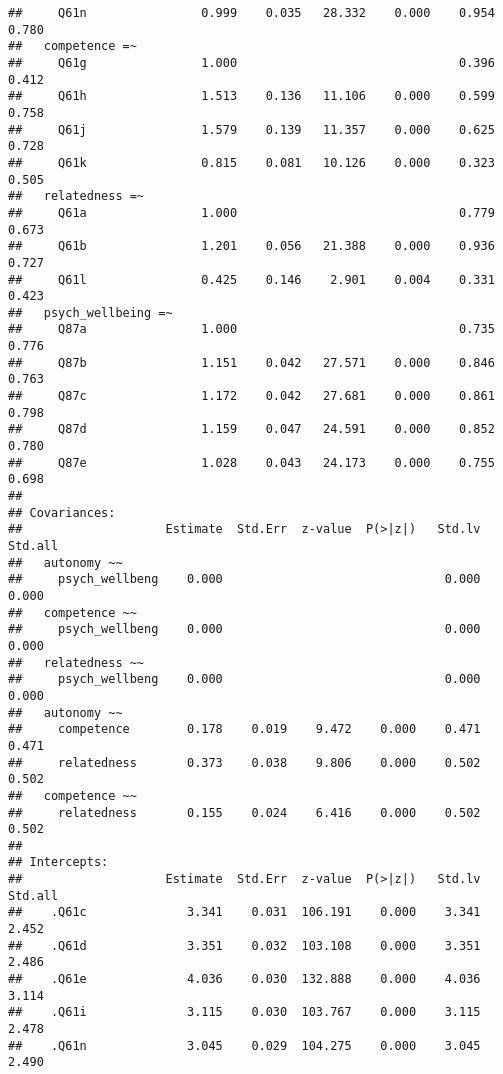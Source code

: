 \documentclass[
]{article}
\begin{document}
\begin{verbatim}
##     Q61n                0.999    0.035   28.332    0.000    0.954    0.780
##   competence =~                                                           
##     Q61g                1.000                               0.396    0.412
##     Q61h                1.513    0.136   11.106    0.000    0.599    0.758
##     Q61j                1.579    0.139   11.357    0.000    0.625    0.728
##     Q61k                0.815    0.081   10.126    0.000    0.323    0.505
##   relatedness =~                                                          
##     Q61a                1.000                               0.779    0.673
##     Q61b                1.201    0.056   21.388    0.000    0.936    0.727
##     Q61l                0.425    0.146    2.901    0.004    0.331    0.423
##   psych_wellbeing =~                                                      
##     Q87a                1.000                               0.735    0.776
##     Q87b                1.151    0.042   27.571    0.000    0.846    0.763
##     Q87c                1.172    0.042   27.681    0.000    0.861    0.798
##     Q87d                1.159    0.047   24.591    0.000    0.852    0.780
##     Q87e                1.028    0.043   24.173    0.000    0.755    0.698
## 
## Covariances:
##                    Estimate  Std.Err  z-value  P(>|z|)   Std.lv  Std.all
##   autonomy ~~                                                           
##     psych_wellbeng    0.000                               0.000    0.000
##   competence ~~                                                         
##     psych_wellbeng    0.000                               0.000    0.000
##   relatedness ~~                                                        
##     psych_wellbeng    0.000                               0.000    0.000
##   autonomy ~~                                                           
##     competence        0.178    0.019    9.472    0.000    0.471    0.471
##     relatedness       0.373    0.038    9.806    0.000    0.502    0.502
##   competence ~~                                                         
##     relatedness       0.155    0.024    6.416    0.000    0.502    0.502
## 
## Intercepts:
##                    Estimate  Std.Err  z-value  P(>|z|)   Std.lv  Std.all
##    .Q61c              3.341    0.031  106.191    0.000    3.341    2.452
##    .Q61d              3.351    0.032  103.108    0.000    3.351    2.486
##    .Q61e              4.036    0.030  132.888    0.000    4.036    3.114
##    .Q61i              3.115    0.030  103.767    0.000    3.115    2.478
##    .Q61n              3.045    0.029  104.275    0.000    3.045    2.490

\end{verbatim}
\end{document}
